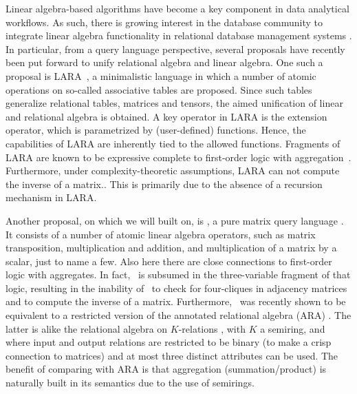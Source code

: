
%
Linear algebra-based algorithms have become a key component in data analytical workflows. As such, there is growing interest in the database community to integrate linear algebra functionality in relational database management systems \cite{}. In particular, from a query language perspective, several proposals have recently been put forward to unify relational algebra and linear algebra. One such a proposal is LARA~\cite{}, a minimalistic language in which a number of atomic operations on so-called associative tables are proposed. Since such tables generalize relational tables, matrices and tensors, the aimed unification of linear and relational algebra is obtained. A key operator in LARA is the extension operator, which is parametrized by (user-defined) functions. Hence, the capabilities of LARA are inherently tied to the allowed functions. Fragments of LARA are known to be expressive complete to first-order logic with aggregation~\cite{}. Furthermore, under complexity-theoretic assumptions, LARA can not compute the inverse of a matrix.\cite{}. This is primarily due to the absence of a recursion mechanism in LARA. 


Another proposal, on which we will built on, is \lang, a pure matrix query language \cite{}. It consists of a number of atomic linear algebra operators, such as matrix transposition, multiplication and addition, and multiplication of a matrix by a scalar, just to name a few. Also here there are close connections to first-order logic with aggregates. In fact, \lang\ is subsumed in the three-variable fragment of that logic, resulting in the inability of \lang\ to check for four-cliques in adjacency matrices and to compute the inverse of a matrix. Furthermore, \lang\ was recently shown to be equivalent to a restricted version of the annotated relational algebra (ARA) \cite{}. The latter is alike the relational algebra on $K$-relations \cite{}, with $K$ a semiring, and  where input and output relations are restricted to be binary (to make a crisp connection to matrices) and at most three distinct attributes can be used. The benefit of comparing with ARA is that aggregation (summation/product) is naturally built in its semantics due to the use of semirings.

